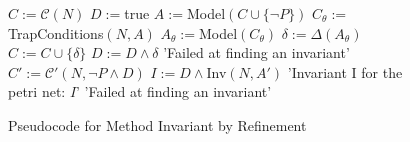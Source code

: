 \begin{figure}
  \begin{algorithmic}[1]
    \State $C := \mathcal C(N)$
    \State $D := $true
    \State $A := $Model$(C \cup \{\neg P\})$
    \State $C_\theta := $TrapConditions$(N, A)$
    \State $A_\theta := $Model$(C_\theta)$
    \State $\delta := \Delta(A_\theta)$
    \State $C := C \cup \{\delta\}$
    \State $D := D \land \delta$
    \Else
    \State \Return 'Failed at finding an invariant'
    \EndIf
    \EndWhile
    \State $C' := \mathcal C'(N, \neg P \land D)$
    \State $I := D \land $Inv$(N, A')$
    \State \Return 'Invariant I for the petri net: $I$'
    \Else
    \State \Return 'Failed at finding an invariant'
    \EndIf
  \end{algorithmic}
  \caption{Pseudocode for Method Invariant by Refinement}
  \label{fig:method-invariant-by-refinement-pseudocode}
\end{figure}

